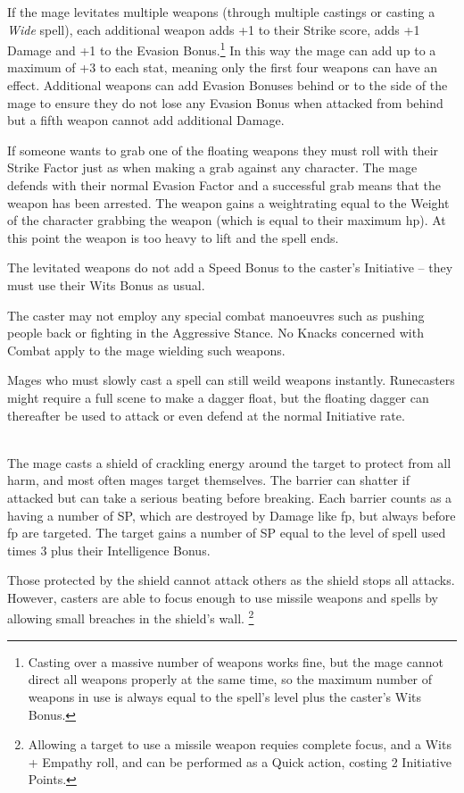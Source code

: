 \begin{multicols}{2}
If the mage levitates multiple weapons (through multiple castings or casting a \textit{Wide} spell), each additional weapon adds +1 to their Strike score, adds +1 Damage and +1 to the Evasion Bonus.\footnote{Casting over a massive number of weapons works fine, but the mage cannot direct all weapons properly at the same time, so the maximum number of weapons in use is always equal to the spell's level plus the caster's Wits Bonus.}
In this way the mage can add up to a maximum of +3 to each stat, meaning only the first four weapons can have an effect.
Additional weapons can add Evasion Bonuses behind or to the side of the mage to ensure they do not lose any Evasion Bonus when attacked from behind but a fifth weapon cannot add additional Damage.

If someone wants to grab one of the floating weapons they must roll with their Strike Factor just as when making a grab against any character.
The mage defends with their normal Evasion Factor and a successful grab means that the weapon has been arrested.
The weapon gains a \gls{weightrating} equal to the Weight of the character grabbing the weapon (which is equal to their maximum \gls{hp}).
At this point the weapon is too heavy to lift and the spell ends.

The levitated weapons do not add a Speed Bonus to the caster's Initiative -- they must use their Wits Bonus as usual.

The caster may not employ any special combat manoeuvres such as pushing people back or fighting in the Aggressive Stance. No Knacks concerned with Combat apply to the mage wielding such weapons.

Mages who must slowly cast a spell can still weild weapons instantly.  Runecasters might require a full scene to make a dagger float, but the floating dagger can thereafter be used to attack or even defend at the normal Initiative rate.

\\
The mage casts a shield of crackling energy around the target to protect from all harm, and most often mages target themselves.  The barrier can shatter if attacked but can take a serious beating before breaking. Each barrier counts as a having a number of \gls{SP}, which are destroyed by Damage like \gls{fp}, but always before \gls{fp} are targeted.
The target gains a number of \gls{SP} equal to the level of spell used times 3 plus their Intelligence Bonus.

Those protected by the shield cannot attack others as the shield stops all attacks.
However, casters are able to focus enough to use missile weapons and spells by allowing small breaches in the shield's wall.
\footnote{Allowing a target to use a missile weapon requies complete focus, and a Wits + Empathy roll, and can be performed as a Quick action, costing 2 Initiative Points.}


\end{multicols}
